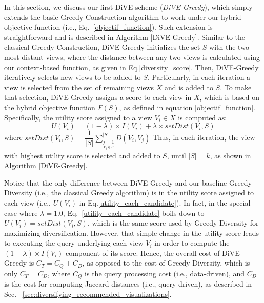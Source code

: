 In this section, we discuss our first DiVE scheme ({\em DiVE-Greedy}), which simply extends the basic Greedy Construction algorithm to work under our hybrid objective function (i.e., Eq.~\ref{objectif_function}). 
%
Such extension is straightforward  and is described in Algorithm \ref{DiVE-Greedy}. 
%
Similar to the classical Greedy Construction, DiVE-Greedy initializes the set $S$ with the two most distant views,  where the distance between any two views is calculated using our context-based function, as given in Eq.\ref{diversity_score}.
%
Then, DiVE-Greedy iteratively selects new views to be added to $S$. 
%
Particularly, in each iteration a view is selected from the set of remaining views $X$ and is added to $S$.
%
To make that selection, DiVE-Greedy assigns a score to each view in $X$, which is based on the hybrid objective function $F\left(S\right)$, as defined in equation \ref{objectif_function}. 
%
Specifically, the utility score assigned to a view $V_i \in X$ is computed as: 
\begin{equation}
	U\left(V_i\right)= \left(1-\lambda\right) \times I\left(V_i\right) + \lambda \times setDist\left(V_i, S\right)
	\label{utility_each_candidate}
\end{equation}
\noindent where $setDist\left(V_i, S\right) = \dfrac{1}{|S|} \sum_{\underset{V_j \in S}{j=1}}^{|S|} D\left(V_i, V_j\right) $
Thus, in each iteration, the view with highest utility score is selected and added to $S$, until $|S|=k$, as shown in Algorithm \ref{DiVE-Greedy}.  

%
Notice that the only difference between DiVE-Greedy and our baseline Greedy-Diversity (i.e., the classical Greedy algorithm) is in the utility score assigned to each view (i.e., $U(V_i)$ in Eq.\ref{utility_each_candidate}). 
%
In fact, in the special case where $\lambda=1.0$, Eq.~\ref{utility_each_candidate} boils down to $U\left(V_i\right)= setDist\left(V_i, S\right)$, which is the same score used by Greedy-Diversity for maximizing diversification. 
%
However, that simple change in the utility score leads to executing the query underlying each view $V_i$ in order to compute the $\left(1-\lambda\right) \times I\left(V_i\right)$ component of its score. 
%
Hence, the overall cost of DiVE-Greedy is $C_T=C_Q+C_D$, as opposed to the cost of Greedy-Diversity, which is only $C_T=C_D$, where $C_Q$ is the query processing cost (i.e., data-driven), and $C_D$ is the cost for computing Jaccard distances (i.e., query-driven), as described in Sec. ~\ref{sec:diversifying_recommended_visualizations}.

